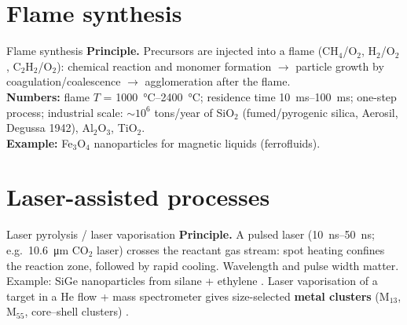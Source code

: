 \section{Flame synthesis}
\begin{cardbox}{Flame synthesis }
\textbf{Principle.} Precursors are injected into a flame (CH$_4$/O$_2$, H$_2$/O$_2$, C$_2$H$_2$/O$_2$): chemical
reaction and monomer formation $\to$ particle growth by coagulation/coalescence $\to$ agglomeration after the flame.\\
\textbf{Numbers:} flame $T$ = \SIrange{1000}{2400}{\celsius}; residence time \SIrange{10}{100}{ms}; one-step process;
industrial scale: $\sim10^6$ tons/year of SiO$_2$ (fumed/pyrogenic silica, Aerosil, Degussa 1942), Al$_2$O$_3$, TiO$_2$.\\
\textbf{Example:} Fe$_3$O$_4$ nanoparticles for magnetic liquids (ferrofluids).
\end{cardbox}

\section{Laser-assisted processes}
\begin{cardbox}{Laser pyrolysis / laser vaporisation }
\textbf{Principle.} A pulsed laser (\SIrange{10}{50}{ns}; e.g.\ \SI{10.6}{\micro m} CO$_2$ laser) crosses the reactant gas
stream: spot heating confines the reaction zone, followed by rapid cooling. Wavelength and pulse width matter.
Example: SiGe nanoparticles from silane + ethylene .
Laser vaporisation of a target in a He flow + mass spectrometer gives size-selected \textbf{metal clusters}
(M$_{13}$, M$_{55}$, core--shell clusters) .
\end{cardbox}

